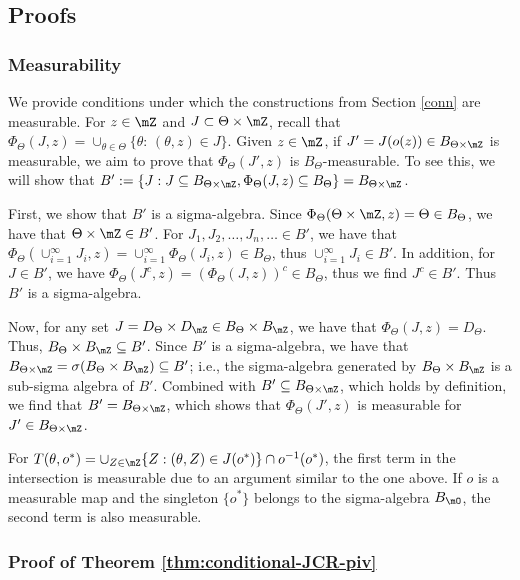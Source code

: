 \documentclass[english]{article}
\begin{document}
\subsection{Proofs}

\subsubsection{Measurability}\label{proof:measurability}
We provide conditions under which the constructions from Section \ref{conn} are measurable.
For $z\in \mZ$ and  
$J \subset  \Theta\times \mZ$,
recall that
$\Phi_\Theta(J,z) =\cup_{\theta \in \Theta} \{\theta:\, (\theta,z) \in J \}$. 
Given $z\in \mZ$,
if $J'=J(o(z)) \in B_{\Theta \times \mZ}$ is measurable, we aim to prove that $\Phi_\Theta(J',z)$  is $B_{\Theta}$-measurable.
To see this, we will show that 
$B' := \{J: J \subseteq B_{\Theta \times \mZ}, \Phi_\Theta(J,z) \subseteq B_{\Theta} \} = B_{\Theta \times \mZ}$.
    
    First, we show that $B'$ is a sigma-algebra. 
    Since $\Phi_\Theta(\Theta \times \mZ,z) = \Theta \in B_\Theta$,
    we have that $\Theta \times \mZ \in B'$. 
    For $J_1,J_2,\ldots,J_n,\ldots \in B'$, we have that $\Phi_\Theta(\cup_{i=1}^\infty J_i,z) = \cup_{i=1}^\infty \Phi_\Theta(J_i,z) \in B_{\Theta}$, thus $\cup_{i=1}^\infty J_i \in B'$. 
    In addition, for $J \in B'$, we have $\Phi_\Theta(J^c,z) = (\Phi_\Theta(J,z))^c \in B_\Theta$, thus we find $J^c \in B'$. 
    Thus $B'$ is a sigma-algebra.
    
    Now, for any set $J = 
    D_\Theta \times D_\mZ \in 
    B_\Theta \times B_\mZ$,
    we have that $\Phi_\Theta(J,z) = D_\Theta$.
    Thus, $B_\Theta \times B_\mZ \subseteq B'$. 
    Since $B'$ is a sigma-algebra, we have that $B_{\Theta \times \mZ} = \sigma(B_\Theta \times B_\mZ) \subseteq B'$; i.e., the 
    sigma-algebra generated by $B_\Theta \times B_\mZ$ is a sub-sigma algebra of $B'$. 
    Combined with $B' \subseteq B_{\Theta \times \mZ}$, which holds by definition, we find that $B' = B_{\Theta \times \mZ}$, which shows that $\Phi_\Theta(J',z)$ is measurable for $J' \in B_{\Theta \times \mZ}$.

For 
$T(\theta,o^*) = \cup_{Z \in \mZ}\{Z: (\theta, Z) \in J(o^*)\} \cap o^{-1}(o^*) $, the first term in the intersection  is
measurable due to an argument similar 
to the one above.
If $o$ is a measurable map
and the singleton  $\{o^*\}$ belongs to the sigma-algebra $B_\mO$, 
the second term is also measurable.

\subsubsection{Proof of Theorem \ref{thm:conditional-JCR-piv}}\label{proof:conditional-JCR-piv}
\end{document}
